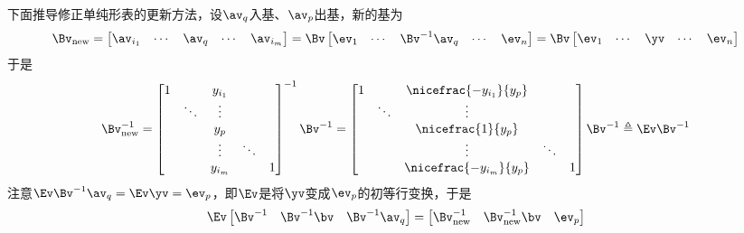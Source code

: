 \documentclass{ctexart}
\begin{document}
下面推导修正单纯形表的更新方法，设$\av_q$入基、$\av_p$出基，新的基为
\begin{align*}
    \Bv_{\text{new}} =
    \begin{bmatrix}
        \av_{i_1} & \cdots & \av_q & \cdots & \av_{i_m}
    \end{bmatrix}
    = \Bv \begin{bmatrix}
              \ev_1 & \cdots & \Bv^{-1} \av_q & \cdots & \ev_n
          \end{bmatrix} = \Bv
    \begin{bmatrix}
        \ev_1 & \cdots & \yv & \cdots & \ev_n
    \end{bmatrix}
\end{align*}
于是
\begin{align*}
    \Bv_{\text{new}}^{-1} =
    \begin{bmatrix}
        1 &        & y_{i_1}              \\
          & \ddots & \vdots               \\
          &        & y_{p}                \\
          &        & \vdots  & \ddots     \\
          &        & y_{i_m} &        & 1
    \end{bmatrix}^{-1} \Bv^{-1} =
    \begin{bmatrix}
        1 &        & \nicefrac{-y_{i_1}}{y_{p}}              \\
          & \ddots & \vdots                                  \\
          &        & \nicefrac{1}{y_{p}}                     \\
          &        & \vdots                     & \ddots     \\
          &        & \nicefrac{-y_{i_m}}{y_{p}} &        & 1
    \end{bmatrix} \Bv^{-1} \triangleq \Ev \Bv^{-1}
\end{align*}
注意$\Ev \Bv^{-1} \av_q = \Ev \yv = \ev_p$，即$\Ev$是将$\yv$变成$\ev_p$的初等行变换，于是
\begin{align*}
    \Ev \begin{bmatrix}
            \Bv^{-1} & \Bv^{-1} \bv & \Bv^{-1} \av_q
        \end{bmatrix} = \begin{bmatrix}
                            \Bv_{\text{new}}^{-1} & \Bv_{\text{new}}^{-1} \bv & \ev_p
                        \end{bmatrix}
\end{align*}
\end{document}
